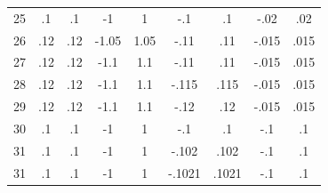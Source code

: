 \documentclass[a4paper,12pt]{article}
\begin{document}
\begin{table}[ht!]
\begin{tabular}{ccccccccc}
   25 & .1 & .1 & -1 & 1 & -.1 & .1 & -.02 & .02\\
   26 & .12 & .12 & -1.05 & 1.05 & -.11 & .11 & -.015 & .015\\
   27 & .12 & .12 & -1.1 & 1.1 & -.11 & .11 & -.015 & .015\\
   28 & .12 & .12 & -1.1 & 1.1 & -.115 & .115 & -.015 & .015\\
   29 & .12 & .12 & -1.1 & 1.1 & -.12 & .12 & -.015 & .015\\
   30 & .1 & .1 & -1 & 1 & -.1 & .1 & -.1 & .1\\
   31 & .1 & .1 & -1 & 1 & -.102 & .102 & -.1 & .1\\
   31 & .1 & .1 & -1 & 1 & -.1021 & .1021 & -.1 & .1\\
  \end{tabular}
\end{table}
\clearpage
\end{document}
